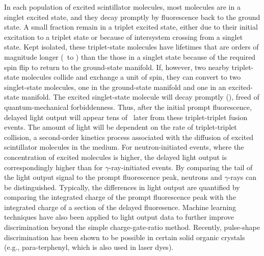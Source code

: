 In each population of excited scintillator molecules, most molecules are in a
singlet excited state, and they decay promptly by fluorescence back to the
ground state. A small fraction remain in a triplet excited state,
either due to their initial excitation to a
triplet state or because of intersystem crossing from a singlet state. Kept isolated, these
triplet-state molecules have lifetimes that are orders of magnitude longer
(\micro\second\ to \milli\second) than the those in a singlet state because of the required spin
flip to return to the ground-state manifold. If, however, two nearby triplet-state
molecules collide and exchange a unit of spin, they can convert to two singlet-state
molecules, one in the ground-state manifold and one in an excited-state manifold. The excited
singlet-state molecule will decay promptly (\nano\second), freed of quantum-mechanical forbiddenness.
Thus, after the initial prompt fluorescence, delayed light output will appear tens
of \nano\second\ later from these triplet-triplet fusion events. The amount of light will be
dependent on the rate of triplet-triplet collision, a second-order kinetics
process associated with the diffusion of excited scintillator molecules in the
medium. For neutron-initiated events, where the concentration of excited molecules is
higher, the delayed light output is correspondingly higher than for $\gamma$-ray-initiated
events. By comparing the tail of the light output signal to the prompt
fluorescence peak, neutrons and $\gamma$-rays can be distinguished. Typically, the differences in
light output are quantified by comparing the integrated charge of the prompt fluorescence peak
with the integrated charge of a section of the delayed fluoresence. Machine learning 
techniques have also been applied to light output data to further improve discrimination 
\cite{Doucet2018} beyond the simple charge-gate-ratio method. Recently, pulse-shape
discrimination has been shown to be possible in certain solid organic crystals (e.g.,
para-terphenyl, which is also used in laser dyes).

